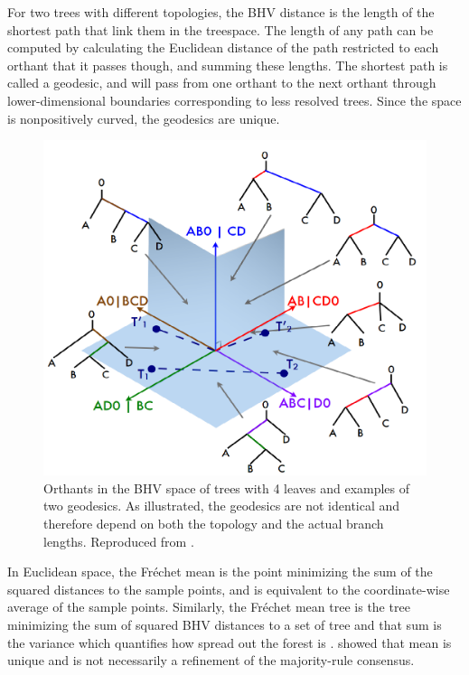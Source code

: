 For two trees with different topologies, the BHV distance is the length of the shortest path that link them in the treespace. The length of any path can be computed by calculating the Euclidean distance of the path restricted to each orthant that it passes though, and summing these lengths. The shortest path is called a geodesic, and will pass from one orthant to the next orthant through lower-dimensional boundaries corresponding to less resolved trees. Since the space is nonpositively  curved, the geodesics are unique.

\begin{figure}
 \includegraphics{Figs/OrthantBHV}
 \caption{Orthants in the BHV space of trees with 4 leaves and examples of two geodesics. As illustrated, the geodesics are not identical and therefore depend on both the topology and the actual branch lengths. Reproduced from \citet{brown2017mean}.}
\end{figure}

In Euclidean space, the Fr\'echet mean is the point minimizing the sum of the squared distances to the sample points, and is equivalent to the coordinate-wise average of the sample points. Similarly, the Fr\'echet mean tree is the tree minimizing the sum of squared BHV distances to a set of tree and that sum is the variance which quantifies how spread out the forest is \citep{miller2015polyhedral,brown2017mean}. \citet{Billera2001} showed that mean is unique and is not necessarily a refinement of the majority-rule consensus.

